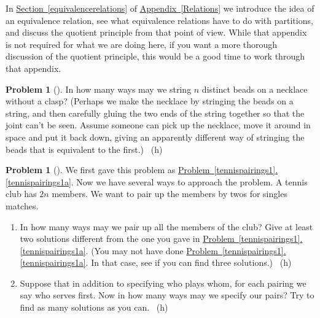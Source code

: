 \documentclass[10pt,]{book}
\theoremstyle{plain}
\theoremstyle{definition}
\newtheorem{activity}[project]{Problem}
\theoremstyle{definition}
\numberwithin{equation}{chapter}
\newcommand{\importantarrow}{\Rightarrow}
\begin{document}
\par
\hypertarget{p-250}{}%
In \hyperref[equivalencerelations]{Section~\ref{equivalencerelations}} of \hyperref[Relations]{Appendix~\ref{Relations}} we introduce the idea of an equivalence relation, see what equivalence relations have to do with partitions, and discuss the quotient principle from that point of view. While that appendix is not required for what we are doing here, if you want a more thorough discussion of the quotient principle, this would be a good time to work through that appendix.%
\begin{activity}[]\marginsymbol[-1em]{} \label{necklace}
\hypertarget{p-251}{}%
In how many ways may we string \(n\) distinct beads on a necklace without a clasp? (Perhaps we make the necklace by stringing the beads on a string, and then carefully gluing the two ends of the string together so that the joint can't be seen. Assume someone can pick up the necklace, move it around in space and put it back down, giving an apparently different way of stringing the beads that is equivalent to the first.)%
~{\tiny (h)}\end{activity}
\begin{activity}[]\marginsymbol[-1em]{\pdftooltip{$\importantarrow$}{especially interesting}} \label{tennispairings2}
\hypertarget{p-255}{}%
We first gave this problem as \hyperref[tennispairings1a]{Problem~\ref{tennispairings1}.\ref{tennispairings1a}}. Now we have several ways to approach the problem. A tennis club has \(2n\) members. We want to pair up the members by twos for singles matches.%
\begin{enumerate}[font=\bfseries,label=(\alph*),ref=\alph*]
\item\label{task-45} \marginsymbol[-2.5em]{} \hypertarget{p-256}{}%
In how many ways may we pair up all the members of the club? Give at least two solutions different from the one you gave in   \hyperref[tennispairings1a]{Problem~\ref{tennispairings1}.\ref{tennispairings1a}}. (You may not have done \hyperref[tennispairings1a]{Problem~\ref{tennispairings1}.\ref{tennispairings1a}}. In that case, see if you can find three solutions.)%
~{\tiny (h)}\item\label{task-46} \marginsymbol[-2.5em]{} \hypertarget{p-260}{}%
Suppose that in addition to specifying who plays whom, for each pairing we say who serves first.  Now in how many ways may we specify our pairs? Try to find as many solutions as you can.%
~{\tiny (h)}\end{enumerate}
\end{activity}
\end{document}
